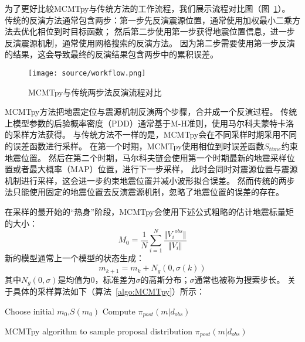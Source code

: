 为了更好比较MCMTpy与传统方法的工作流程，我们展示流程对比图（图~\ref{fig:workflow}）。
传统的反演方法通常包含两步：第一步先反演震源位置，通常使用加权最小二乘方法去优化相位到时目标函数\citep{klein1989user}；
然后第二步使用第一步获得地震位置信息，进一步反演震源机制，通常使用网格搜索的反演方法\citep{Zhu2016}。
因为第二步需要使用第一步反演的结果，这会导致最终的反演结果包含两步中的累积误差。

\begin{figure}[h]
    \centering
    \texttt{[image: source/workflow.png]}
    \caption{MCMTpy与传统两步法反演流程对比}
    \label{fig:workflow}
\end{figure}

MCMTpy方法把地震定位与震源机制反演两个步骤，合并成一个反演过程。
传统上模型参数的后验概率密度（PDD）通常基于M-H准则，使用马尔科夫蒙特卡洛的采样方法获得。
与传统方法不一样的是，MCMTpy会在不同采样时期采用不同的误差函数进行采样。
在第一个时期，MCMTpy使用相位到时误差函数$S_{time}$约束地震位置。
然后在第二个时期，马尔科夫链会使用第一个时期最新的地震采样位置或者最大概率（MAP）位置，进行下一步采样，
此时会同时对震源位置与震源机制进行采样，这会进一步约束地震位置并减小波形拟合误差。
然而传统的两步法只能使用固定的地震位置去反演震源机制，忽略了地震位置的误差的存在。

在采样的最开始的“热身”阶段，MCMTpy会使用下述公式粗略的估计地震标量矩的大小：
\begin{equation}
    M_0 = \frac{1}{N} \sum_{i=1}^N \frac{\Vert {V_i}^{obs} \Vert}{\Vert V_i \Vert}
\end{equation}
新的模型通常上一个模型的状态生成：
\begin{equation}
    m_{k+1} = m_k + N_g(0,\sigma(k))
\end{equation}
其中$N_g(0,\sigma)$是均值为0，标准差为$\sigma$的高斯分布；$\sigma$通常也被称为搜索步长。
关于具体的采样算法如下（算法~\ref{algo:MCMTpy}）所示：

\begin{algorithm}[h]
    \SetAlgoLined
  
    Choose initial $m_0$,$S(m_0)$\;
    Compute $\pi_{post}(m|d_{obs})$\;
    \caption{MCMTpy algorithm to sample proposal distribution $\pi_{post}(m|d_{obs})$}
    \label{algo:MCMTpy}
\end{algorithm}




